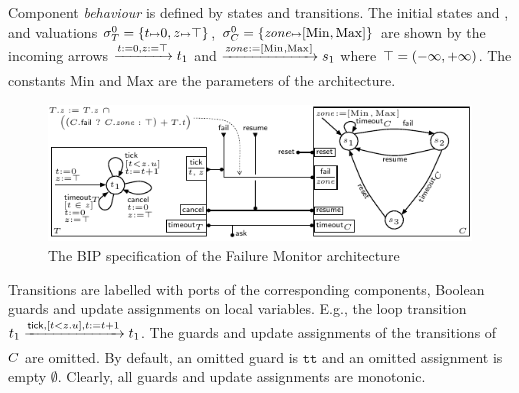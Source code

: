 \documentclass{llncs}
\newcommand{\Ludo}{\\\hfill\mdash Ludo}
\newcommand{\noteLH}[2][color=orange!40, size=\tiny]{\todo[#1]{{#2}\Ludo}}
\newcommand{\mdash}[1][]{---#1}
\newcommand{\ie}[1][\ ]{i.e.#1}
\newcommand{\Eg}[1][\ ]{E.g.#1}
\newcommand{\goesto}[2][]{\ensuremath{\xrightarrow[{#1}\relax]{#2}}}
\newcommand{\true} {\ensuremath{\mathtt{t\!t}}}
\newcommand{\noop} {\ensuremath{\emptyset}} %
\newcommand{\val}[3][]{\ensuremath{#1{\sigma}^{#2}_{#3}}}
\begin{document}
Component \emph{behaviour} is defined by states %
and transitions.
The initial states
 and , and valuations $\val{0}{\NameTimer} = \{t
\mapsto 0, z \mapsto \topinterval\}$,
$\val{0}{\NameCtrl} =
\{\mathit{zone} \mapsto [\mathrm{Min}, \mathrm{Max}]\}$ are shown by
the incoming arrows $\goesto{\TimerInit[]} \tstate{0}$ and
$\goesto{\IntervalInit[]} \cstate{0}$ where $\top=(-\infty, +\infty)$.
The constants $\mathrm{Min}$ and $\mathrm{Max}$ are the parameters
of the architecture.





\begin{figure}[t]
  \centering
  \includegraphics[width=0.9\columnwidth]{BIPspec-ArchFailureTimerMax-v4}
  \caption{The BIP specification of the Failure Monitor architecture}
  \label{fig:schema:ArchFailure:BIP}
\end{figure}



Transitions are labelled with ports of the
corresponding components, Boolean guards and update assignments on local
variables.  \Eg[,] the loop transition $\tstate{0}
\goesto{\PortTick, \GuardTick[], \TimerUpd[]} \tstate{0}$. %
The
guards and update assignments of the transitions of $C$ are
omitted. By default, an omitted guard is  $\true$ and an omitted assignment is empty {\noop}.  
%
Clearly, all guards and update assignments are monotonic.
\end{document}
